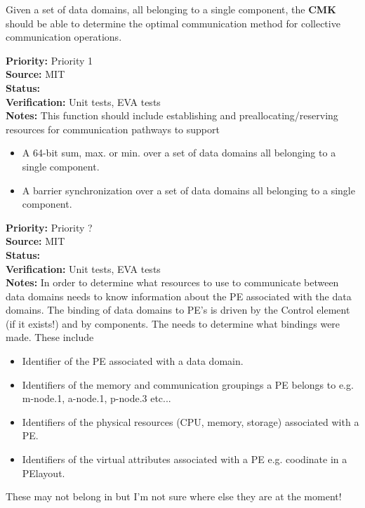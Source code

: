Given a set of data domains, all belonging to a single component, the {\bf CMK} should be able to determine the
optimal communication method for collective communication
operations.
\begin{reqlist}
{\bf Priority:} Priority 1 \\
{\bf Source:}  MIT \\
{\bf Status:}  \\
{\bf Verification:} Unit tests, EVA tests \\
{\bf Notes:}
This function should include establishing and preallocating/reserving 
resources for communication pathways to support
\begin{itemize}
\item A 64-bit sum, max. or min. over a set of data domains all belonging to a single component.
\item A barrier synchronization over a set of data domains all belonging to a single component.
\end{itemize}
\end{reqlist}

\begin{reqlist}
{\bf Priority:} Priority ? \\
{\bf Source:}  MIT \\
{\bf Status:}  \\
{\bf Verification:} Unit tests, EVA tests \\
{\bf Notes:}
In order to determine what resources to use to communicate between data domains 
{\bf \shortname} needs to know information about the PE associated with the
data domains. The binding of data domains to PE's is driven by the Control element
(if it exists!) and by components. The {\bf \shortname} needs to determine what
bindings were made.
These include
\begin{itemize}
\item Identifier of the PE associated with a data domain.
\item Identifiers of the memory and communication groupings a PE
belongs to e.g. m-node.1, a-node.1, p-node.3 etc...
\item Identifiers of the physical resources (CPU, memory, storage) associated with a PE.
\item Identifiers of the virtual attributes associated with a PE e.g. coodinate in a PElayout.
\end{itemize}
These may not belong in {\bf \shortname} but I'm not sure where else they
are at the moment!
\end{reqlist}

